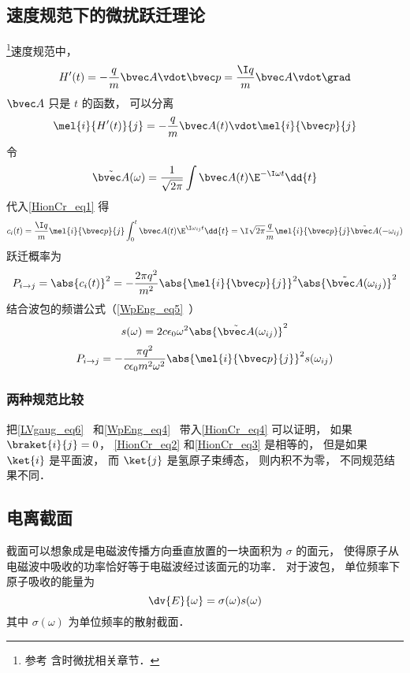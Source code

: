 \subsection{速度规范下的微扰跃迁理论}
\footnote{参考\cite{Merzbacher} 含时微扰相关章节．}速度规范中，
\begin{equation}
H'(t) = -\frac{q}{m}\bvec A \vdot \bvec p = \frac{\I q}{m}\bvec A \vdot \grad
\end{equation}
$\bvec A$ 只是 $t$ 的函数， 可以分离
\begin{equation}
\mel{i}{H'(t)}{j} = -\frac{q}{m}\bvec A(t) \vdot \mel{i}{\bvec p}{j}
\end{equation}
令
\begin{equation}
\tilde {\bvec A}(\omega) = \frac{1}{\sqrt{2\pi}} \int \bvec A(t) \E^{-\I\omega t} \dd{t}
\end{equation}
代入\autoref{HionCr_eq1} 得
\begin{equation}\label{HionCr_eq4}
c_i(t) = \frac{\I q}{m} \mel{i}{\bvec p}{j} \int_0^t  \bvec A(t) \E^{\I\omega_{ij} t} \dd{t} = \I\sqrt{2\pi}\frac{q}{m} \mel{i}{\bvec p}{j} \tilde {\bvec A}(-\omega_{ij})
\end{equation}
跃迁概率为
\begin{equation}\label{HionCr_eq3}
P_{i\to j} = \abs{c_i(t)}^2 = -\frac{2\pi q^2}{m^2} \abs{\mel{i}{\bvec p}{j}}^2 \abs{\tilde {\bvec A}(\omega_{ij})}^2
\end{equation}
结合波包的频谱公式（\autoref{WpEng_eq5}~）
\begin{equation}
s(\omega) = 2c\epsilon_0 \omega^2 \abs{\tilde {\bvec A}(\omega_{ij})}^2
\end{equation}
\begin{equation}
P_{i\to j} = -\frac{\pi q^2}{c\epsilon_0 m^2 \omega^2} \abs{\mel{i}{\bvec p}{j}}^2 s(\omega_{ij})
\end{equation}

\subsubsection{两种规范比较}
把\autoref{LVgaug_eq6}~ 和\autoref{WpEng_eq4}~ 带入\autoref{HionCr_eq4} 可以证明， 如果 $\braket{i}{j} = 0$， \autoref{HionCr_eq2} 和\autoref{HionCr_eq3} 是相等的， 但是如果 $\ket{i}$ 是平面波， 而 $\ket{j}$ 是氢原子束缚态， 则内积不为零， 不同规范结果不同．

\subsection{电离截面}
截面可以想象成是电磁波传播方向垂直放置的一块面积为 $\sigma$ 的面元， 使得原子从电磁波中吸收的功率恰好等于电磁波经过该面元的功率． 对于波包， 单位频率下原子吸收的能量为
\begin{equation}
\dv{E}{\omega} = \sigma(\omega) s(\omega)
\end{equation}
其中 $\sigma(\omega)$ 为单位频率的散射截面．
